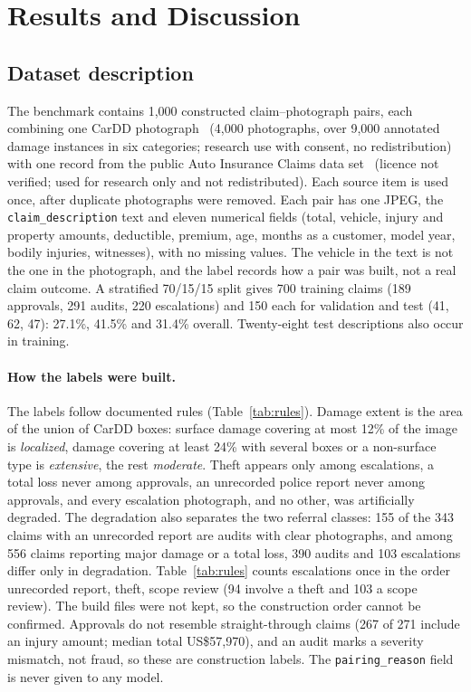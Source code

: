 \section{Results and Discussion}\label{sec:results}

\subsection{Dataset description}\label{sec:data}

The benchmark contains 1,000 constructed claim--photograph pairs, each combining one CarDD photograph~\cite{wang2023cardd} (4,000 photographs, over 9,000 annotated damage instances in six categories; research use with consent, no redistribution) with one record from the public Auto Insurance Claims data set~\cite{kaggleclaims} (licence not verified; used for research only and not redistributed). Each source item is used once, after duplicate photographs were removed. Each pair has one JPEG, the \texttt{claim\_description} text and eleven numerical fields (total, vehicle, injury and property amounts, deductible, premium, age, months as a customer, model year, bodily injuries, witnesses), with no missing values. The vehicle in the text is not the one in the photograph, and the label records how a pair was built, not a real claim outcome. A stratified 70/15/15 split gives 700 training claims (189 approvals, 291 audits, 220 escalations) and 150 each for validation and test (41, 62, 47): 27.1\%, 41.5\% and 31.4\% overall. Twenty-eight test descriptions also occur in training.

\paragraph{How the labels were built.}
The labels follow documented rules (Table~\ref{tab:rules}). Damage extent is the area of the union of CarDD boxes: surface damage covering at most 12\% of the image is \emph{localized}, damage covering at least 24\% with several boxes or a non-surface type is \emph{extensive}, the rest \emph{moderate}. Theft appears only among escalations, a total loss never among approvals, an unrecorded police report never among approvals, and every escalation photograph, and no other, was artificially degraded. The degradation also separates the two referral classes: 155 of the 343 claims with an unrecorded report are audits with clear photographs, and among 556 claims reporting major damage or a total loss, 390 audits and 103 escalations differ only in degradation. Table~\ref{tab:rules} counts escalations once in the order unrecorded report, theft, scope review (94 involve a theft and 103 a scope review). The build files were not kept, so the construction order cannot be confirmed. Approvals do not resemble straight-through claims (267 of 271 include an injury amount; median total US\$57,970), and an audit marks a severity mismatch, not fraud, so these are construction labels. The \texttt{pairing\_reason} field is never given to any model.

